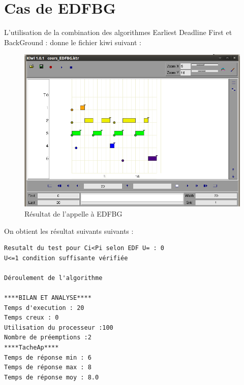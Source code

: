 \section{Cas de EDFBG}
L'utilisation de la combination des algorithmes Earliest Deadline First et BackGround : donne  le fichier kiwi suivant : 
\begin{figure}[htbp]
  \centering
  \includegraphics[scale=0.60]{img/EDFBG}
  \caption{Résultat de l'appelle à EDFBG}
  \label{fig:EDFBG}
\end{figure}
On obtient les résultat suivants suivants : 

\begin{verbatim}
Resutalt du test pour Ci<Pi selon EDF U= : 0
U<=1 condition suffisante vérifiée

Déroulement de l'algorithme

****BILAN ET ANALYSE****
Temps d'execution : 20
Temps creux : 0
Utilisation du processeur :100
Nombre de préemptions :2
****TacheAp****
Temps de réponse min : 6
Temps de réponse max : 8
Temps de réponse moy : 8.0
\end{verbatim}
